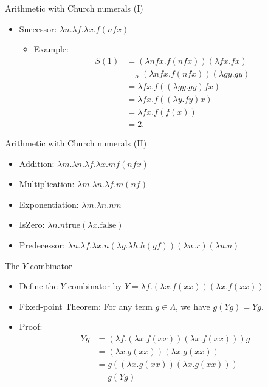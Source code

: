 \documentclass{beamer}
\newcommand{\true}{\mathrm{true}}
\newcommand{\false}{\mathrm{false}}
\begin{document}
\begin{frame}{Arithmetic with Church numerals (I)}
\begin{itemize}
\item Successor: $\lambda n.\lambda f.\lambda x. f (n f x)$
  \begin{itemize}
    \item Example: \begin{align*}
     S(1) & = (\lambda nfx. f(nfx))(\lambda fx.fx)
      \\ & =_\alpha (\lambda nfx. f(nfx))(\lambda gy.gy)
      \\ &= \lambda fx. f ((\lambda gy.gy) fx) 
      \\ &= \lambda fx. f ((\lambda y.fy) x)
      \\ &= \lambda fx. f (f(x))
      \\ &= 2.
      \end{align*}
  \end{itemize}
\end{itemize}
\end{frame}

\begin{frame}{Arithmetic with Church numerals (II)}
\begin{itemize}
\item Addition: $\lambda m.\lambda n.\lambda f.\lambda x. m f (n f x)$
\item Multiplication: $\lambda m.\lambda n.\lambda f. m (n f)$
\item Exponentiation: $\lambda m.\lambda n. n m$
\item IsZero: $\lambda n. n \true  (\lambda x. \false)$
\item Predecessor: $\lambda n.\lambda f.\lambda x. n (\lambda g.\lambda h. h (g f)) (\lambda u. x) (\lambda u. u)$
\end{itemize}
\end{frame}

\begin{frame}{The $Y$-combinator}
\begin{itemize}
\item Define the $Y$-combinator by $Y = \lambda f.(\lambda x.f (x x)) (\lambda x.f (x x))$
\item Fixed-point Theorem: For any term $g \in \Lambda$, we have $g(Yg) = Yg$. 
\item Proof: 
\begin{align*}
Y g	& = (\lambda f . (\lambda x . f (x x)) (\lambda x . f (x x))) g
\\ & = (\lambda x . g (x x)) (\lambda x . g (x x))	
\\ & = g ((\lambda x . g (x x)) (\lambda x . g (x x)))	
\\ & = g (Y g)
\end{align*}
\end{itemize}
\end{frame}
\end{document}
